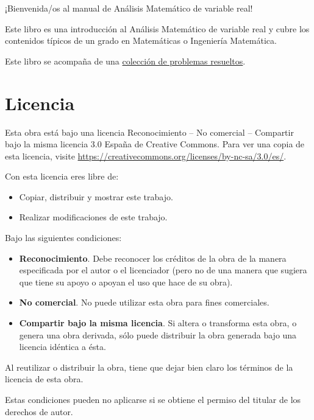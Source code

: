 \documentclass[
  a4paper,
]{scrreport}
\providecommand{\tightlist}{%
  \setlength{\itemsep}{0pt}\setlength{\parskip}{0pt}}\usepackage{longtable,booktabs,array}
\theoremstyle{definition}
\theoremstyle{plain}
\theoremstyle{definition}
\theoremstyle{definition}
\theoremstyle{plain}
\theoremstyle{plain}
\theoremstyle{remark}
\begin{document}

¡Bienvenida/os al manual de Análisis Matemático de variable real!

Este libro es una introducción al Análisis Matemático de variable real y
cubre los contenidos típicos de un grado en Matemáticas o Ingeniería
Matemática.

Este libro se acompaña de una
\href{https://aprendeconalf.es/analisis-ejercicios/}{colección de
problemas resueltos}.

\section*{Licencia}\label{licencia}


Esta obra está bajo una licencia Reconocimiento -- No comercial --
Compartir bajo la misma licencia 3.0 España de Creative Commons. Para
ver una copia de esta licencia, visite
\url{https://creativecommons.org/licenses/by-nc-sa/3.0/es/}.

Con esta licencia eres libre de:

\begin{itemize}
\tightlist
\item
  Copiar, distribuir y mostrar este trabajo.
\item
  Realizar modificaciones de este trabajo.
\end{itemize}

Bajo las siguientes condiciones:

\begin{itemize}
\item
  \textbf{Reconocimiento}. Debe reconocer los créditos de la obra de la
  manera especificada por el autor o el licenciador (pero no de una
  manera que sugiera que tiene su apoyo o apoyan el uso que hace de su
  obra).
\item
  \textbf{No comercial}. No puede utilizar esta obra para fines
  comerciales.
\item
  \textbf{Compartir bajo la misma licencia}. Si altera o transforma esta
  obra, o genera una obra derivada, sólo puede distribuir la obra
  generada bajo una licencia idéntica a ésta.
\end{itemize}

Al reutilizar o distribuir la obra, tiene que dejar bien claro los
términos de la licencia de esta obra.

Estas condiciones pueden no aplicarse si se obtiene el permiso del
titular de los derechos de autor.
\end{document}

